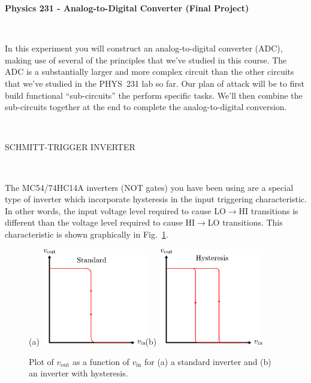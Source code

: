\documentclass[12pt,oneside,openany,letterpaper]{article}
\begin{document}
\thispagestyle{plain}
\begin{center}
{\large{\bf{\selectfont Physics 231 - Analog-to-Digital Converter (Final Project)}}}
\end{center}


~

\noindent In this experiment you will construct an analog-to-digital converter (ADC), making use of several of the principles that we've studied in this course.  The ADC is a substantially larger and more complex circuit than the other circuits that we've studied in the PHYS~231 lab so far.  Our plan of attack will be to first build functional ``sub-circuits'' the perform specific tasks.  We'll then combine the sub-circuits together at the end to complete the analog-to-digital conversion.

~

\noindent SCHMITT-TRIGGER INVERTER

~

\noindent The MC54/74HC14A inverters (NOT gates) you have been using are a special type of inverter which incorporate hysteresis in the input triggering characteristic. In other words, the input
voltage level required to cause LO$\to$HI transitions is different than the voltage level required to cause HI$\to$LO transitions. This characteristic is shown graphically in Fig.~\ref{fig:schmitt}.

\begin{figure}[ht]
\centering
    (a)~\includegraphics[width=0.4\textwidth]{figures/stdNot.pdf}\qquad (b)~\includegraphics[width=0.4\textwidth]{figures/hystNot.pdf}
    \caption{Plot of $v_\mathrm{out}$ as a function of $v_\mathrm{in}$ for (a) a standard inverter and (b) an inverter with hysteresis.}
    \label{fig:schmitt}
\end{figure}
\end{document}
